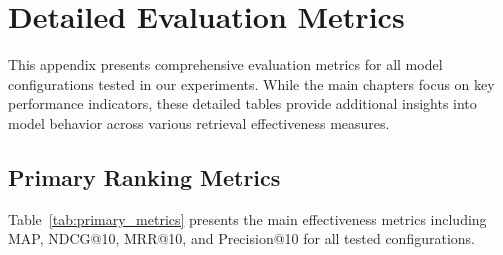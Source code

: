 \chapter{Detailed Evaluation Metrics} %

\label{AppendixA}


This appendix presents comprehensive evaluation metrics for all model configurations tested in our experiments. While the main chapters focus on key performance indicators, these detailed tables provide additional insights into model behavior across various retrieval effectiveness measures.

\section{Primary Ranking Metrics}
Table~\ref{tab:primary_metrics} presents the main effectiveness metrics including MAP, NDCG@10, MRR@10, and Precision@10 for all tested configurations.

